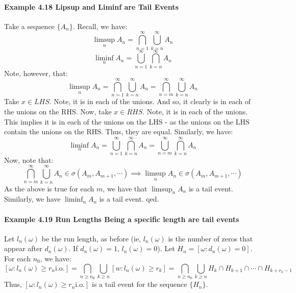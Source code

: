 \documentclass[12pt,a4paper]{article}
\newcommand{\1}[1]{\mathbbm{1}\left\{ #1 \right\}}
\newcommand{\io}{\text{i.o.}}
\begin{document}
\paragraph{Example 4.18 Lipsup and Liminf are Tail Events} Take a sequence $\{A_n\}$. Recall, we have:
$$
	\limsup_n A_n = \bigcap_{n=1}^\infty \bigcup_{k=n}^\infty A_n
$$
$$
	\liminf_n A_n = \bigcup_{n=1}^\infty \bigcap_{k=n}^\infty A_n
$$
Note, however, that:
$$
	\limsup_n A_n = \bigcap_{n=1}^\infty \bigcup_{k=n}^\infty A_n = \bigcap_{n=m}^\infty \bigcup_{k=n}^\infty A_n
$$
Take $x \in LHS$. Note, it is in each of the unions. And so, it clearly is in each of the unions on the RHS. Now, take $x \in RHS$. Note, it is in each of the unions. This implies it is in each of the unions on the LHS - as the unions on the LHS contain the unions on the RHS. Thus, they are equal. Similarly, we have:
$$
	\liminf_n A_n = \bigcup_{n=1}^\infty \bigcap_{k=n}^\infty A_n = \bigcup_{n=m}^\infty \bigcap_{k=n}^\infty A_n
$$
Now, note that:
$$
	\bigcap_{n=m}^\infty \bigcup_{k=n}^\infty A_n \in \sigma(A_m, A_{m+1}, \cdots) \implies
	\limsup_n A_n \in \sigma(A_m, A_{m+1}, \cdots)
$$
As the above is true for each $m$, we have that $\limsup_n A_n$ is a tail event. Similarly, we have $\liminf_n A_n$ is a tail event. qed.

\paragraph{Example 4.19 Run Lengths Being a specific length are tail events} Let $l_n(\omega)$ be the run length, as before (ie, $l_n(\omega)$ is the number of zeros that appear after $d_n(\omega)$. If $d_n(\omega) = 1$, $l_n(\omega) = 0$). Let $H_n = [\omega : d_n(\omega) = 0]$. For each $n_0$, we have:
$$
	[\omega : l_n(\omega) \geq r_n \io] =
	\bigcap_{n \geq n_0} \bigcup_{k \geq n} [w: l_n(\omega) \geq r_k] =
	\bigcap_{n \geq n_0} \bigcup_{k \geq n} H_k \cap H_{k+1} \cap \cdots \cap H_{k + r_k - 1}
$$
Thus, $[\omega : l_n(\omega) \geq r_n \io]$ is a tail event for the sequence $\{H_n\}$.
\end{document}
